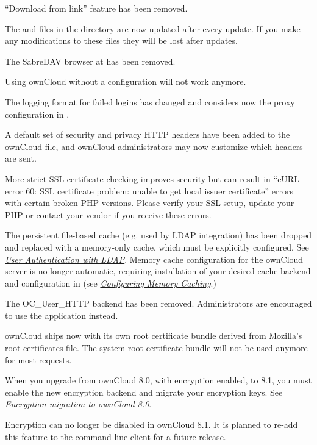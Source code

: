 \documentclass[letterpaper,10pt,english]{sphinxmanual}
\begin{document}
``Download from link'' feature has been removed.

The  and  files in the  directory are now
updated after every update. If you make any modifications to these files they
will be lost after updates.

The SabreDAV browser at  has been removed.

Using ownCloud without a  configuration will not work anymore.

The logging format for failed logins has changed and considers now the proxy
configuration in .

A default set of security and privacy HTTP headers have been added to the
ownCloud  file, and ownCloud administrators may now customize which
headers are sent.

More strict SSL certificate checking improves security but can result in
``cURL error 60: SSL certificate problem: unable to get local issuer certificate''
errors with certain broken PHP versions. Please verify your SSL setup, update your
PHP or contact your vendor if you receive these errors.

The persistent file-based cache (e.g. used by LDAP integration) has been dropped and
replaced with a memory-only cache, which must be explicitly configured. See
{\hyperref[configuration_user/user_auth_ldap::doc]{\emph{User Authentication with LDAP}}}. Memory cache configuration for the
ownCloud server is no longer automatic, requiring installation of
your desired cache backend and configuration in
 (see {\hyperref[configuration_server/caching_configuration::doc]{\emph{Configuring Memory Caching}}}.)

The OC\_User\_HTTP backend has been removed. Administrators are encouraged to use
the  application instead.

ownCloud ships now with its own root certificate bundle derived from Mozilla's
root certificates file. The system root certificate bundle will not be used
anymore for most requests.

When you upgrade from ownCloud 8.0, with encryption enabled, to 8.1, you must
enable the new encryption backend and migrate your encryption keys. See
{\hyperref[configuration_files/encryption_configuration:upgrading-encryption-label]{\emph{Encryption migration to ownCloud 8.0}}}.

Encryption can no longer be disabled in ownCloud 8.1. It is planned to re-add
this feature to the command line client for a future release.
\end{document}
